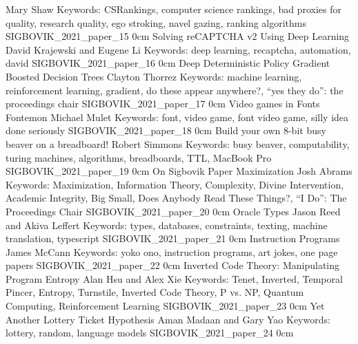 	{Mary Shaw}
	{Keywords: CSRankings, computer science rankings, bad proxies for quality, research quality, ego stroking, navel gazing, ranking algorithms}
	{SIGBOVIK_2021_paper_15}
	{0cm}
	{}
\addpaper
	{Solving reCAPTCHA v2 Using Deep Learning}
	{David Krajewski and Eugene Li}
	{Keywords: deep learning, recaptcha, automation, david}
	{SIGBOVIK_2021_paper_16}
	{0cm}
	{}
\addpaper
	{Deep Deterministic Policy Gradient Boosted Decision Trees}
	{Clayton Thorrez}
	{Keywords: machine learning, reinforcement learning, gradient, do these appear anywhere?, ``yes they do'': the proceedings chair}
	{SIGBOVIK_2021_paper_17}
	{0cm}
	{}
\addpaper
	{Video games in Fonts Fontemon}
	{Michael Mulet}
	{Keywords: font, video game, font video game, silly idea done seriously}
	{SIGBOVIK_2021_paper_18}
	{0cm}
	{}
\addpaper
	{Build your own 8-bit busy beaver on a breadboard!}
	{Robert Simmons}
	{Keywords: busy beaver, computability, turing machines, algorithms, breadboards, TTL, MacBook Pro}
	{SIGBOVIK_2021_paper_19}
	{0cm}
	{}
\addpaper
	{On Sigbovik Paper Maximization}
	{Josh Abrams}
	{Keywords: Maximization, Information Theory, Complexity, Divine Intervention, Academic Integrity, Big Small, Does Anybody Read These Things?, ``I Do'': The Proceedings Chair}
	{SIGBOVIK_2021_paper_20}
	{0cm}
	{}
\addpaper
	{Oracle Types}
	{Jason Reed and Akiva Leffert}
	{Keywords: types, databases, constraints, texting, machine translation, typescript}
	{SIGBOVIK_2021_paper_21}
	{0cm}
	{}
\addpaper
	{Instruction Programs}
	{James McCann}
	{Keywords: yoko ono, instruction programs, art jokes, one page papers}
	{SIGBOVIK_2021_paper_22}
	{0cm}
	{}
\addpaper
	{Inverted Code Theory: Manipulating Program Entropy}
	{Alan Hsu and Alex Xie}
	{Keywords: Tenet, Inverted, Temporal Pincer, Entropy, Turnstile, Inverted Code Theory, P vs. NP, Quantum Computing, Reinforcement Learning}
	{SIGBOVIK_2021_paper_23}
	{0cm}
	{}
\addpaper
	{Yet Another Lottery Ticket Hypothesis}
	{Aman Madaan and Gary Yao}
	{Keywords: lottery, random, language models}
	{SIGBOVIK_2021_paper_24}
	{0cm}
	{}


